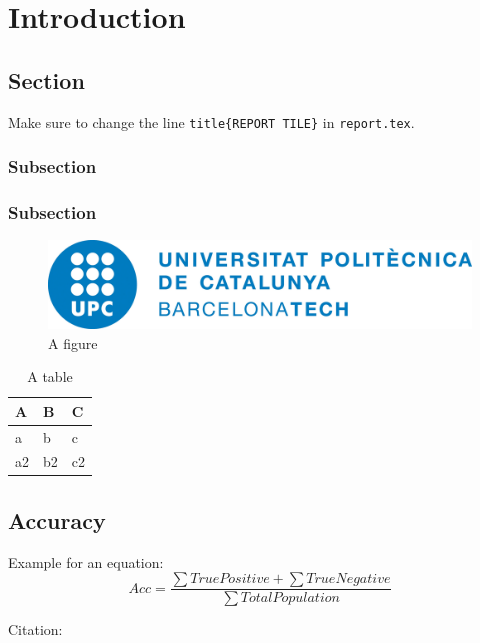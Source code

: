 \chapter{Introduction}

\section{Section}

Make sure to change the line \texttt{title\{REPORT TILE\}} in \texttt{report.tex}.

\subsection{Subsection}

\subsection{Subsection}

\begin{figure}[H]
\centering
\includegraphics[scale=0.5]{img/title/upc}
\caption{A figure}
\label{sf_map} 
\end{figure}


\begin{table}[H]
\centering
\begin{tabular}{@{}lll@{}}
\toprule
\textbf{A}  & \textbf{B} & \textbf{C}\\ 
\midrule
a & \multicolumn{1}{l|}{b} & c \\
a2 & \multicolumn{1}{l|}{b2} & c2 \\
\bottomrule
\end{tabular}
\caption{A table}
\label{tab:tab1}
\end{table}

\section{Accuracy}
Example for an equation:
\[ Acc = \frac{\sum{True Positive} + \sum{True Negative}}{\sum{Total Population}} \]

Citation: \cite{breiman2001random}